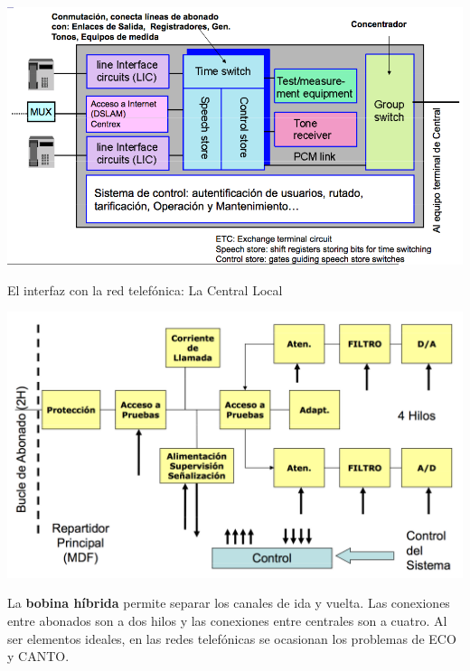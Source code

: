 \documentclass[10pt,portrait, twocolumn]{article}
\makeatletter
\renewcommand{\subsubsection}{\@startsection{subsubsection}{3}{0mm}%
                                {-1ex plus -.5ex minus -.2ex}%
                                {1ex plus .2ex}%
                                {\normalfont\small\bfseries}}
\makeatother
\begin{document}
	\begin{center}
		\includegraphics[scale=0.2]{images/CentralFuncional2}
	\end{center}

El interfaz con la red telefónica: La Central Local

	\begin{center}
		\includegraphics[scale=0.2]{images/InterfazRed}
	\end{center}


La \textbf{bobina híbrida} permite separar los canales de ida y vuelta. Las conexiones entre abonados son a dos hilos y las conexiones entre centrales son a cuatro. Al ser elementos ideales, en las redes telefónicas se ocasionan los problemas de ECO y CANTO.
%
	
\end{document}

